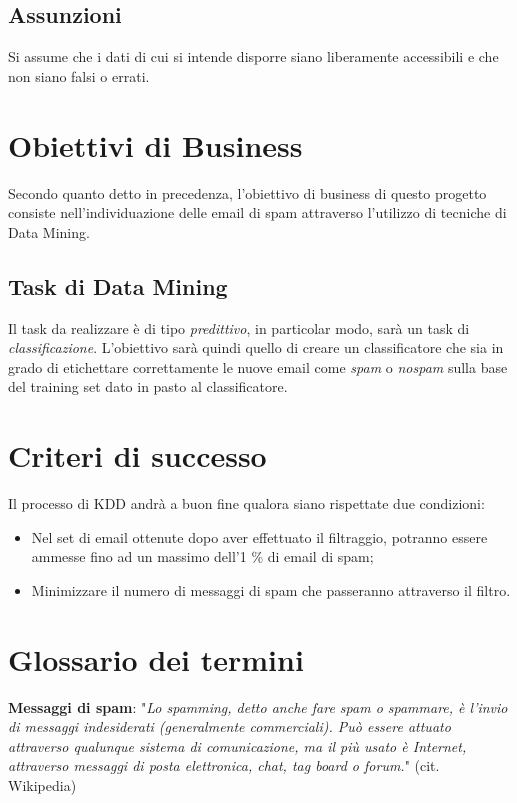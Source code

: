 \subsection{Assunzioni}
	Si assume che i dati di cui si intende disporre siano liberamente accessibili e che non siano falsi o errati.

\section{Obiettivi di Business}
	Secondo quanto detto in precedenza, l'obiettivo di business di questo progetto consiste nell'individuazione delle email di spam attraverso l'utilizzo di tecniche di Data Mining.

\subsection{Task di Data Mining}
	Il task da realizzare è di tipo \textit{predittivo}, in particolar modo, sarà un task di \textit{classificazione}. L'obiettivo sarà quindi quello di creare un classificatore che sia in grado di etichettare correttamente le nuove email come \textit{spam} o \textit{nospam} sulla base del training set dato in pasto al classificatore. 

\section{Criteri di successo}
	Il processo di KDD andrà a buon fine qualora siano rispettate due condizioni:
	\begin{itemize}
		\item 	Nel set di email ottenute dopo aver effettuato il filtraggio, potranno essere ammesse fino ad un massimo dell'1 \% di email di spam;
		\item	Minimizzare il numero di messaggi di spam che passeranno attraverso il filtro.
	\end{itemize}

\section{Glossario dei termini}
\textbf{Messaggi di spam}: "\textit{Lo spamming, detto anche fare spam o spammare, è l'invio di messaggi indesiderati (generalmente commerciali). Può essere attuato attraverso qualunque sistema di comunicazione, ma il più usato è Internet, attraverso messaggi di posta elettronica, chat, tag board o forum.}" (cit. Wikipedia)\cite{wiki:Spam}

